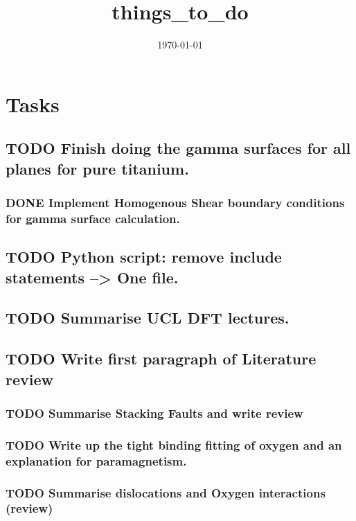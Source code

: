 \documentclass[11pt]{article}
\date{\today}
\title{things\_to\_do}
\begin{document}
\maketitle
\tableofcontents




\section{Tasks}
\label{sec-1}
\subsection{{\bfseries\sffamily TODO} Finish doing the gamma surfaces for all planes for pure titanium.}
\label{sec-1-1}
\subsubsection{{\bfseries\sffamily DONE} Implement Homogenous Shear boundary conditions for gamma surface calculation.}
\label{sec-1-1-1}
\subsection{{\bfseries\sffamily TODO} Python script: remove include statements  -->  One file.}
\label{sec-1-2}
\subsection{{\bfseries\sffamily TODO} Summarise UCL DFT lectures.}
\label{sec-1-3}
\subsection{{\bfseries\sffamily TODO} Write first paragraph of Literature review}
\label{sec-1-4}
\subsubsection{{\bfseries\sffamily TODO} Summarise Stacking Faults and write review}
\label{sec-1-4-1}
\subsubsection{{\bfseries\sffamily TODO} Write up the tight binding fitting of oxygen and an explanation for paramagnetism.}
\label{sec-1-4-2}
\subsubsection{{\bfseries\sffamily TODO} Summarise dislocations and Oxygen interactions (review)}
\label{sec-1-4-3}
\end{document}
